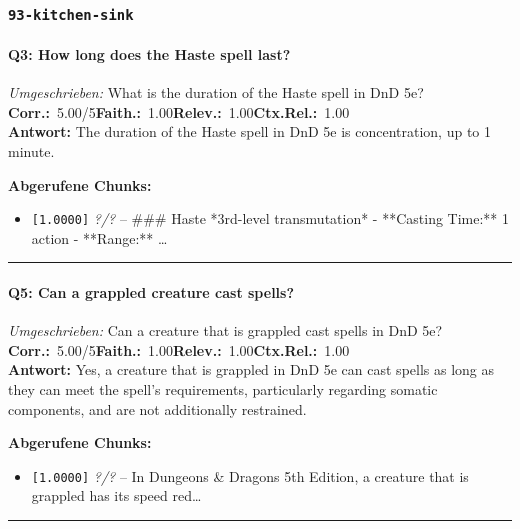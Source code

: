 \subsubsection*{\texttt{93-kitchen-sink}}
\label{app:samples:93_kitchen_sink}

\paragraph{Q3: How long does the Haste spell last?}
\textit{Umgeschrieben:} What is the duration of the Haste spell in DnD 5e?\\[2pt]
\noindent \textbf{Corr.:}~5.00/5\quad \textbf{Faith.:}~1.00\quad \textbf{Relev.:}~1.00\quad \textbf{Ctx.Rel.:}~1.00\\

\noindent\textbf{Antwort:} The duration of the Haste spell in DnD 5e is concentration, up to 1 minute.

\noindent\textbf{Abgerufene Chunks:}
\begin{itemize}[noitemsep, topsep=2pt]
  \item[\textbf{\#1}] \texttt{[1.0000]} \textit{?/?} -- \#\#\# Haste  *3rd-level transmutation*  - **Casting Time:** 1 action - **Range:** \ldots
\end{itemize}
\vspace{4pt}
\hrule
\vspace{6pt}

\paragraph{Q5: Can a grappled creature cast spells?}
\textit{Umgeschrieben:} Can a creature that is grappled cast spells in DnD 5e?\\[2pt]
\noindent \textbf{Corr.:}~5.00/5\quad \textbf{Faith.:}~1.00\quad \textbf{Relev.:}~1.00\quad \textbf{Ctx.Rel.:}~1.00\\

\noindent\textbf{Antwort:} Yes, a creature that is grappled in DnD 5e can cast spells as long as they can meet the spell's requirements, particularly regarding somatic components, and are not additionally restrained.

\noindent\textbf{Abgerufene Chunks:}
\begin{itemize}[noitemsep, topsep=2pt]
  \item[\textbf{\#1}] \texttt{[1.0000]} \textit{?/?} -- In Dungeons \& Dragons 5th Edition, a creature that is grappled has its speed red\ldots
\end{itemize}
\vspace{4pt}
\hrule
\vspace{6pt}

